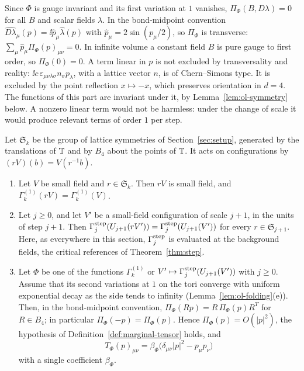 \begin{remark}\label{rem:marginal-orders}
Since $\Phi$ is gauge invariant and its first variation at $1$ vanishes, $\Pi_\Phi(B,D\lambda)=0$ for all $B$ and scalar fields $\lambda$. In the bond-midpoint convention $\widehat{D\lambda}_\mu(p)=\ii\hat p_\mu\hat\lambda(p)$ with $\hat p_\mu=2\sin(p_\mu/2)$, so $\Pi_\Phi$ is transverse: $\sum_\mu\hat p_\mu\Pi_\Phi(p)_{\mu\nu}=0$. In infinite volume a constant field $B$ is pure gauge to first order, so $\Pi_\Phi(0)=0$. A term linear in $p$ is not excluded by transversality and reality: $\ii c\,\varepsilon_{\mu\nu\lambda\sigma}n_\sigma p_\lambda$, with a lattice vector $n$, is of Chern--Simons type. It is excluded by the point reflection $x\mapsto-x$, which preserves orientation in $d=4$. The functions of this part are invariant under it, by Lemma~\ref{lem:ol-symmetry} below. A nonzero linear term would not be harmless: under the change of scale it would produce relevant terms of order $1$ per step.
\end{remark}

Let $\mathfrak S_k$ be the group of lattice symmetries of Section~\ref{sec:setup}, generated by the translations of $\mathbb T$ and by $B_4$ about the points of $\mathbb T$. It acts on configurations by $(rV)(b)=V(r^{-1}b)$.

\begin{lemma}\label{lem:ol-symmetry}
\begin{enumerate}[label=(\alph*)]
\item Let $V$ be small field and $r\in\mathfrak S_k$. Then $rV$ is small field, and $\Gamma^{(1)}_k(rV)=\Gamma^{(1)}_k(V)$.
\item Let $j\ge0$, and let $V'$ be a small-field configuration of scale $j+1$, in the units of step $j+1$. Then $\Gamma^{\rm step}_j(U_{j+1}(rV'))=\Gamma^{\rm step}_j(U_{j+1}(V'))$ for every $r\in\mathfrak S_{j+1}$. Here, as everywhere in this section, $\Gamma^{\rm step}_j$ is evaluated at the background fields, the critical references of Theorem~\ref{thm:step}.
\item Let $\Phi$ be one of the functions $\Gamma^{(1)}_k$ or $V'\mapsto\Gamma^{\rm step}_j(U_{j+1}(V'))$ with $j\ge0$. Assume that its second variations at $1$ on the tori converge with uniform exponential decay as the side tends to infinity (Lemma~\ref{lem:ol-folding}(e)). Then, in the bond-midpoint convention, $\Pi_\Phi(Rp)=R\,\Pi_\Phi(p)R^T$ for $R\in B_4$; in particular $\Pi_\Phi(-p)=\Pi_\Phi(p)$. Hence $\Pi_\Phi(p)=O(|p|^2)$, the hypothesis of Definition~\ref{def:marginal-tensor} holds, and
\[
T_\Phi(p)_{\mu\nu}=\beta_\Phi\big(\delta_{\mu\nu}|p|^2-p_\mu p_\nu\big)
\]
with a single coefficient $\beta_\Phi$.
\end{enumerate}
\end{lemma}

